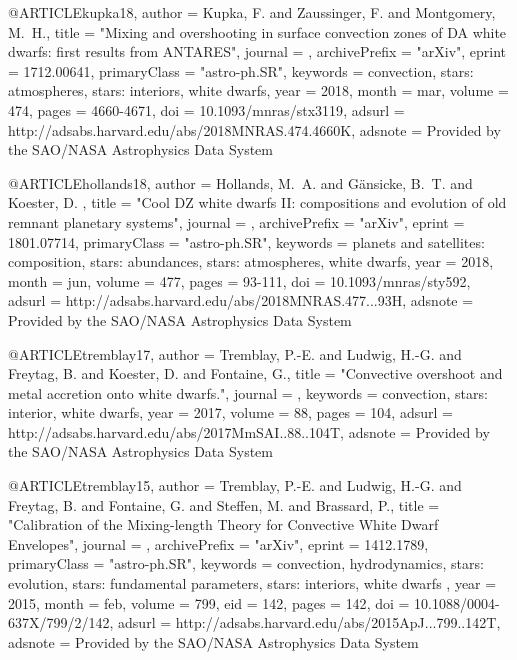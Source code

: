 \documentclass[a4paper,fleqn,usenatbib]{mnras}
\begin{document}
@ARTICLE{kupka18,
   author = {{Kupka}, F. and {Zaussinger}, F. and {Montgomery}, M.~H.},
    title = "{Mixing and overshooting in surface convection zones of DA white dwarfs: first results from ANTARES}",
  journal = {\mnras},
archivePrefix = "arXiv",
   eprint = {1712.00641},
 primaryClass = "astro-ph.SR",
 keywords = {convection, stars: atmospheres, stars: interiors, white dwarfs},
     year = 2018,
    month = mar,
   volume = 474,
    pages = {4660-4671},
      doi = {10.1093/mnras/stx3119},
   adsurl = {http://adsabs.harvard.edu/abs/2018MNRAS.474.4660K},
  adsnote = {Provided by the SAO/NASA Astrophysics Data System}
}


@ARTICLE{hollands18,
   author = {{Hollands}, M.~A. and {G{\"a}nsicke}, B.~T. and {Koester}, D.
	},
    title = "{Cool DZ white dwarfs II: compositions and evolution of old remnant planetary systems}",
  journal = {\mnras},
archivePrefix = "arXiv",
   eprint = {1801.07714},
 primaryClass = "astro-ph.SR",
 keywords = {planets and satellites: composition, stars: abundances, stars: atmospheres, white dwarfs},
     year = 2018,
    month = jun,
   volume = 477,
    pages = {93-111},
      doi = {10.1093/mnras/sty592},
   adsurl = {http://adsabs.harvard.edu/abs/2018MNRAS.477...93H},
  adsnote = {Provided by the SAO/NASA Astrophysics Data System}
}


@ARTICLE{tremblay17,
   author = {{Tremblay}, P.-E. and {Ludwig}, H.-G. and {Freytag}, B. and 
	{Koester}, D. and {Fontaine}, G.},
    title = "{Convective overshoot and metal accretion onto white dwarfs.}",
  journal = {\memsai},
 keywords = {convection, stars: interior, white dwarfs},
     year = 2017,
   volume = 88,
    pages = {104},
   adsurl = {http://adsabs.harvard.edu/abs/2017MmSAI..88..104T},
  adsnote = {Provided by the SAO/NASA Astrophysics Data System}
}

@ARTICLE{tremblay15,
   author = {{Tremblay}, P.-E. and {Ludwig}, H.-G. and {Freytag}, B. and 
	{Fontaine}, G. and {Steffen}, M. and {Brassard}, P.},
    title = "{Calibration of the Mixing-length Theory for Convective White Dwarf Envelopes}",
  journal = {\apj},
archivePrefix = "arXiv",
   eprint = {1412.1789},
 primaryClass = "astro-ph.SR",
 keywords = {convection, hydrodynamics, stars: evolution, stars: fundamental parameters, stars: interiors, white dwarfs },
     year = 2015,
    month = feb,
   volume = 799,
      eid = {142},
    pages = {142},
      doi = {10.1088/0004-637X/799/2/142},
   adsurl = {http://adsabs.harvard.edu/abs/2015ApJ...799..142T},
  adsnote = {Provided by the SAO/NASA Astrophysics Data System}
}
\end{document}
